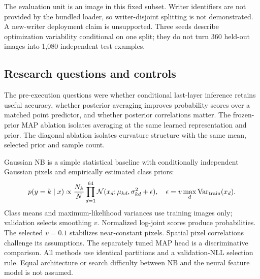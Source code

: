 \documentclass[10pt,a4paper]{article}
\begin{document}
The evaluation unit is an image in this fixed subset. Writer identifiers are
not provided by the bundled loader, so writer-disjoint splitting is not
demonstrated. A new-writer deployment claim is unsupported. Three seeds describe
optimization variability conditional on one split; they do not turn 360
held-out images into 1,080 independent test examples.

\subsection{Research questions and controls}
The pre-execution questions were whether conditional last-layer inference
retains useful accuracy, whether posterior averaging improves probability
scores over a matched point predictor, and whether posterior correlations
matter. The frozen-prior MAP ablation isolates averaging at the same learned
representation and prior. The diagonal ablation isolates curvature structure
with the same mean, selected prior and sample count.

Gaussian NB is a simple statistical baseline with conditionally independent
Gaussian pixels and empirically estimated class priors:
\begin{equation}
p(y=k\mid x)\propto\frac{N_k}{N}\prod_{d=1}^{64}
\mathcal N(x_d;\mu_{kd},\sigma_{kd}^2+\epsilon),\quad
\epsilon=v\max_d\operatorname{Var}_{\rm train}(x_d).
\end{equation}
Class means and maximum-likelihood variances use training images only;
validation selects smoothing $v$. Normalized log-joint scores produce probabilities.
The selected $v=0.1$ stabilizes near-constant pixels. Spatial pixel
correlations challenge its assumptions. The separately tuned MAP head is a
discriminative comparison. All methods use identical partitions and a
validation-NLL selection rule. Equal architecture or search difficulty between
NB and the neural feature model is not assumed.
\end{document}
